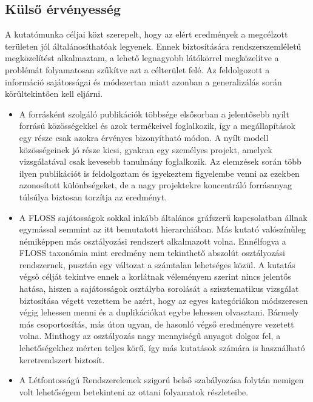 \documentclass[12pt,magyar,a4paper,oneside]{scrreprt}
\begin{document}
\hypertarget{kuxfclsux151-uxe9rvuxe9nyessuxe9g}{%
\subsection{Külső érvényesség}\label{kuxfclsux151-uxe9rvuxe9nyessuxe9g}}

A kutatómunka céljai közt szerepelt, hogy az elért eredmények a
megcélzott területen jól általánosíthatóak legyenek. Ennek biztosítására
rendszerszemléletű megközelítést alkalmaztam, a lehető legnagyobb
látókörrel megközelítve a problémát folyamatosan szűkítve azt a
célterület felé. Az feldolgozott a információ sajátosságai és módszertan
miatt azonban a generalizálás során körültekintően kell eljárni.

\begin{itemize}
\item
  A forrásként szolgáló publikációk többsége elsősorban a jelentősebb
  nyílt forrású közösségekkel és azok termékeivel foglalkozik, így a
  megállapítások egy része csak azokra érvényes bizonyítható módon. A
  nyílt modell közösségeinek jó része kicsi, gyakran egy személyes
  projekt, amelyek vizsgálatával csak kevesebb tanulmány foglalkozik. Az
  elemzések során több ilyen publikációt is feldolgoztam és igyekeztem
  figyelembe venni az ezekben azonosított különbségeket, de a nagy
  projektekre koncentráló forrásanyag túlsúlya biztosan torzítja az
  eredményt.
\item
  A FLOSS sajátosságok sokkal inkább általános gráfszerű kapcsolatban
  állnak egymással semmint az itt bemutatott hierarchiában. Más kutató
  valószínűleg némiképpen más osztályozási rendszert alkalmazott volna.
  Ennélfogva a FLOSS taxonómia mint eredmény nem tekinthető abszolút
  osztályozási rendszernek, pusztán egy változat a számtalan lehetséges
  közül. A kutatás végső célját tekintve ennek a korlátnak véleményem
  szerint nincs jelentős hatása, hiszen a sajátosságok osztályba
  sorolását a szisztematikus vizsgálat biztosítása végett vezettem be
  azért, hogy az egyes kategóriákon módszeresen végig lehessen menni és
  a duplikációkat egybe lehessen olvasztani. Bármely más csoportosítás,
  más úton ugyan, de hasonló végső eredményre vezetett volna. Minthogy
  az osztályozás nagy mennyiségű anyagot dolgoz fel, a lehetőségekhez
  mérten teljes körű, így más kutatások számára is használható
  keretrendszert biztosít.
\item
  A Létfontosságú Rendszerelemek szigorú belső szabályozása folytán
  nemigen volt lehetőségem betekinteni az ottani folyamatok részleteibe.

\end{itemize}
\end{document}
